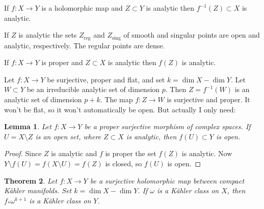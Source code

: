 \documentclass[11pt]{amsart}
\newtheorem{theo}{Theorem}
\newtheorem{lemm}[theo]{Lemma}
\theoremstyle{definition}
\begin{document}
If $f : X \to Y$ is a holomorphic map and $Z \subset Y$ is analytic then $f^{-1}(Z) \subset X$ is analytic.

If $Z$ is analytic the sets $Z_{\text{reg}}$ and $Z_{\text{sing}}$ of smooth and singular points are open and analytic, respectively.
The regular points are dense.

If $f : X \to Y$ is proper and $Z \subset X$ is analytic then $f(Z)$ is analytic.


Let $f : X \to Y$ be surjective, proper and flat, and set $k = \dim X - \dim Y$.
Let $W \subset Y$ be an irreducible analytic set of dimension $p$.
Then $Z = f^{-1}(W)$ is an analytic set of dimension $p+k$.
The map $f : Z \to W$ is surjective and proper.
It won't be flat, so it won't automatically be open.
But actually I only need:

\begin{lemm}
Let $f : X \to Y$ be a proper surjective morphism of complex spaces.
If $U = X \setminus Z$ is an open set, where $Z \subset X$ is analytic, then $f(U) \subset Y$ is open.
\end{lemm}

\begin{proof}
Since $Z$ is analytic and $f$ is proper the set $f(Z)$ is analytic.
Now
\(
Y \setminus f(U)
= f(X \setminus U)
= f(Z)
\)
is closed, so $f(U)$ is open.
\end{proof}


\begin{theo}
Let $f : X \to Y$ be a surjective holomorphic map between compact K\"ahler manifolds.
Set $k = \dim X - \dim Y$.
If $\omega$ is a K\"ahler class on $X$, then $f_*\omega^{k+1}$ is a K\"ahler class on $Y$.
\end{theo}
\end{document}
